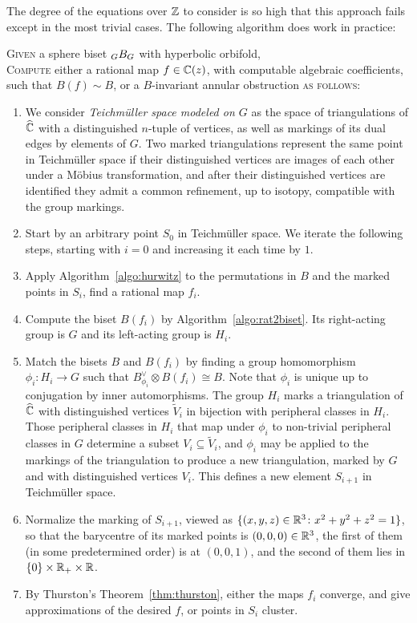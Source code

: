 \documentclass{amsart}
\begin{document}
The degree of the equations over ${\mathbb Z}$ to consider is so high that this
approach fails except in the most trivial cases. The following
algorithm does work in practice:
\begin{algo}\label{algo:thurston}
  \textsc{Given} a sphere biset $\subscript GB_G$ with hyperbolic orbifold,\\
  \textsc{Compute} either a rational map $f\in{\mathbb C}(z)$, with computable
  algebraic coefficients, such that $B(f)\sim B$, or a $B$-invariant
  annular obstruction \textsc{as follows:}\\\upshape
  \begin{enumerate}
  \item We consider \emph{Teichm\"uller space modeled on $G$} as the
    space of triangulations of ${\widehat{{\mathbb C}}}$ with a distinguished $n$-tuple of
    vertices, as well as markings of its dual edges by elements of
    $G$. Two marked triangulations represent the same point in
    Teichm\"uller space if their distinguished vertices are images of
    each other under a M\"obius transformation, and after their
    distinguished vertices are identified they admit a common
    refinement, up to isotopy, compatible with the group markings.
  \item Start by an arbitrary point $S_0$ in Teichm\"uller space. We
    iterate the following steps, starting with $i=0$ and increasing it
    each time by $1$.
  \item Apply Algorithm~\ref{algo:hurwitz} to the permutations in $B$
    and the marked points in $S_i$, find a rational map $f_i$.\label{algo:thurston:3}
  \item Compute the biset $B(f_i)$ by
    Algorithm~\ref{algo:rat2biset}. Its right-acting group is
    $G$ and its left-acting group is $H_i$.\label{algo:thurston:4}
  \item Match the bisets $B$ and $B(f_i)$ by finding a group
    homomorphism $\phi_i\colon H_i\to G$ such that
    $B_{\phi_i}^\vee\otimes B(f_i)\cong B$. Note that $\phi_i$ is
    unique up to conjugation by inner automorphisms. The group $H_i$
    marks a triangulation of ${\widehat{{\mathbb C}}}$ with distinguished vertices
    $\widetilde V_i$ in bijection with peripheral classes in
    $H_i$. Those peripheral classes in $H_i$ that map under $\phi_i$
    to non-trivial peripheral classes in $G$ determine a subset
    $V_i\subseteq \widetilde V_i$, and $\phi_i$ may be applied to the
    markings of the triangulation to produce a new triangulation,
    marked by $G$ and with distinguished vertices $V_i$. This defines
    a new element $S_{i+1}$ in Teichm\"uller space.\label{algo:thurston:5}
  \item Normalize the marking of $S_{i+1}$, viewed as
    $\{(x,y,z)\in {\mathbb R}^3\colon x^2+y^2+z^2=1\}$, so that the barycentre
    of its marked points is $(0,0,0)\in{\mathbb R}^3$, the first of them (in
    some predetermined order) is at $(0,0,1)$, and the second of them
    lies in $\{0\}\times{\mathbb R}_+\times{\mathbb R}$.
  \item By Thurston's Theorem~\ref{thm:thurston}, either the maps
    $f_i$ converge, and give approximations of the desired $f$, or
    points in $S_i$ cluster.


\end{enumerate}
\end{algo}
\end{document}
